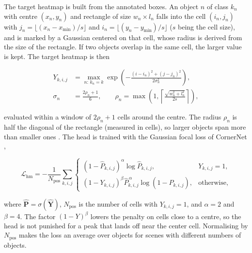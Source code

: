 The target heatmap is built from the annotated boxes. An object $n$ of class $k_n$ with centre $(x_n, y_n)$
and rectangle of size $w_n \times l_n$ falls into the cell $(i_n, j_n)$ with $j_n = \lfloor (x_n - x_{\min}) / s
\rfloor$ and $i_n = \lfloor (y_n - y_{\min}) / s \rfloor$ ($s$ being the cell size), and is marked by a Gaussian centered on that cell,
whose radius is derived from the size of the rectangle. If two objects overlap in the same cell,
the larger value is kept. The target heatmap is then 

\begin{equation}
    \begin{aligned}
        Y_{k,i,j} &= \max_{n:\, k_n = k} \exp\!\left( -\frac{(i - i_n)^2 + (j - j_n)^2}{2 \sigma_n^2} \right), \\
        \sigma_n &= \frac{2\rho_n + 1}{6}, \qquad
        \rho_n = \max\!\left( 1, \left\lceil \frac{\sqrt{w_n^2 + l_n^2}}{2s} \right\rceil \right),
    \end{aligned}
    \label{eq:design-target}
\end{equation}

evaluated within a window of $2\rho_n + 1$ cells around the centre. The radius $\rho_n$ is half the diagonal
of the rectangle (measured in cells), so larger objects span more than smaller ones \cite{Law2018CornerNet}. The head is trained with the
Gaussian focal loss of CornerNet \cite{Law2018CornerNet},

\begin{equation}
    \mathcal{L}_{\mathrm{hm}} = -\frac{1}{N_{\mathrm{pos}}} \sum_{k,i,j}
    \begin{cases}
        \left( 1 - \hat{P}_{k,i,j} \right)^{\alpha} \log \hat{P}_{k,i,j}, & Y_{k,i,j} = 1, \\[0.4em]
        \left( 1 - Y_{k,i,j} \right)^{\beta} \hat{P}_{k,i,j}^{\,\alpha} \log\!\left( 1 - \hat{P}_{k,i,j} \right),
        & \text{otherwise},
    \end{cases}
    \label{eq:design-hmloss}
\end{equation}

where $\hat{\mathbf{P}} = \sigma(\hat{\mathbf{Y}})$, $N_{\mathrm{pos}}$ is the number of cells with
$Y_{k,i,j} = 1$, and $\alpha = 2$ and $\beta = 4$. The factor $(1 - Y)^{\beta}$ lowers the penalty on cells
close to a centre, so the head is not punished for a peak that lands off near the center cell. Normalising by
$N_{\mathrm{pos}}$ makes the loss an average over objects for scenes with different numbers of objects.

